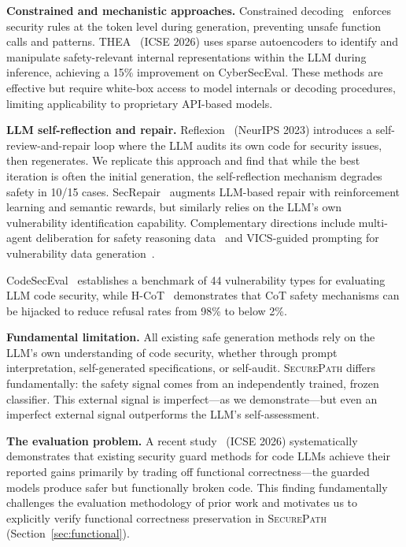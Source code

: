 \documentclass[10pt,conference]{IEEEtran}
\begin{document}
\textbf{Constrained and mechanistic approaches.} Constrained decoding~\cite{constraineddecode} enforces security rules at the token level during generation, preventing unsafe function calls and patterns. THEA~\cite{thea} (ICSE 2026) uses sparse autoencoders to identify and manipulate safety-relevant internal representations within the LLM during inference, achieving a 15\% improvement on CyberSecEval. These methods are effective but require white-box access to model internals or decoding procedures, limiting applicability to proprietary API-based models.

\textbf{LLM self-reflection and repair.} Reflexion~\cite{reflexion} (NeurIPS 2023) introduces a self-review-and-repair loop where the LLM audits its own code for security issues, then regenerates. We replicate this approach and find that while the best iteration is often the initial generation, the self-reflection mechanism degrades safety in 10/15 cases. SecRepair~\cite{secrepair} augments LLM-based repair with reinforcement learning and semantic rewards, but similarly relies on the LLM's own vulnerability identification capability. Complementary directions include multi-agent deliberation for safety reasoning data~\cite{aidsafe} and VICS-guided prompting for vulnerability data generation~\cite{vics}.

CodeSecEval~\cite{codesec} establishes a benchmark of 44 vulnerability types for evaluating LLM code security, while H-CoT~\cite{hcot} demonstrates that CoT safety mechanisms can be hijacked to reduce refusal rates from 98\% to below 2\%.

\textbf{Fundamental limitation.} All existing safe generation methods rely on the LLM's own understanding of code security, whether through prompt interpretation, self-generated specifications, or self-audit. \textsc{SecurePath} differs fundamentally: the safety signal comes from an independently trained, frozen classifier. This external signal is imperfect---as we demonstrate---but even an imperfect external signal outperforms the LLM's self-assessment.

\textbf{The evaluation problem.} A recent study~\cite{rethinking} (ICSE 2026) systematically demonstrates that existing security guard methods for code LLMs achieve their reported gains primarily by trading off functional correctness---the guarded models produce safer but functionally broken code. This finding fundamentally challenges the evaluation methodology of prior work and motivates us to explicitly verify functional correctness preservation in \textsc{SecurePath} (Section~\ref{sec:functional}).
\end{document}
